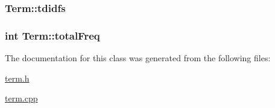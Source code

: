 \subsubsection[{tdidfs}]{ Term\+::tdidfs\hspace{0.3cm}{\ttfamily [private]}}\label{class_term_a8a6d9637da60e1200bb91b5108c601b5}
\hypertarget{class_term_a075587aedd4009c7c207dc3fdd5b33cd}{}
\subsubsection[{total\+Freq}]{\setlength{\rightskip}{0pt plus 5cm}int Term\+::total\+Freq\hspace{0.3cm}{\ttfamily [private]}}\label{class_term_a075587aedd4009c7c207dc3fdd5b33cd}


The documentation for this class was generated from the following files\+:\begin{DoxyCompactItemize}
\item 
\hyperlink{term_8h}{term.\+h}\item 
\hyperlink{term_8cpp}{term.\+cpp}\end{DoxyCompactItemize}
